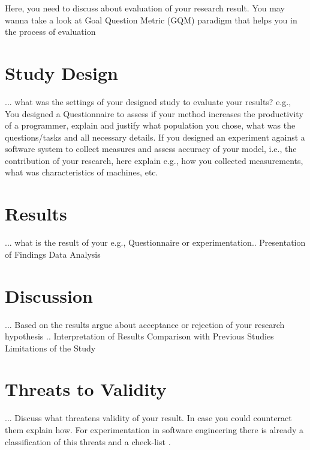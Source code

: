 Here, you need to discuss about evaluation of your research result. You may wanna take a look at Goal Question Metric (GQM) paradigm that helps you in the process of evaluation \cite{caldiera1994goal}

\section{Study Design}
... what was the settings of your designed study to evaluate your results? e.g., You designed a Questionnaire to assess if your method increases the productivity of a programmer, explain and justify what population you chose, what was the questions/tasks and all necessary details. If you designed an experiment against a software system to collect measures and assess accuracy of your model, i.e., the contribution of your research, here explain e.g., how you collected measurements, what was characteristics of machines, etc.

\section{Results}
... what is the result of your e.g., Questionnaire or experimentation.. 
Presentation of Findings
Data Analysis

\section{Discussion}
... Based on the results argue about acceptance or rejection of your research hypothesis   .. 
Interpretation of Results
Comparison with Previous Studies
Limitations of the Study

\section{Threats to Validity}
... Discuss what threatens validity of your result. In case you could counteract them explain how. For experimentation in software engineering there is already a classification of this threats and a check-list \cite{DBLP:journals/ese/RunesonH09}.   

